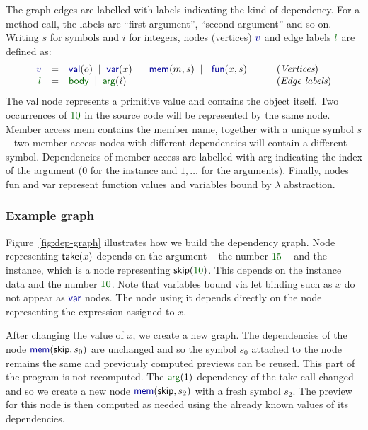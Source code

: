 \documentclass[english,submission]{programming}
\theoremstyle{plain}
\theoremstyle{definition}
\newcommand{\lsep}{\;\;|\;\;}
\newcommand{\num}[1]{\textcolor{numclr}{#1}}
\newcommand{\ident}[1]{\textnormal{\textcolor{idclr}{\sffamily #1}}}
\newcommand{\kvd}[1]{\textnormal{\textcolor{kvdclr}{\sffamily #1}}}
\newcommand{\bndclr}[1]{\textcolor{kvdclr}{#1}}
\newcommand{\blblclr}[1]{\textcolor{numclr}{#1}}
\newcommand{\bnd}[1]{\textnormal{\textcolor{kvdclr}{\sffamily #1}}}
\newcommand{\blbl}[1]{\textnormal{\textcolor{numclr}{\sffamily #1}}}
\begin{document}
The graph edges are labelled with labels indicating the kind of dependency. For
a method call, the labels are ``first argument'', ``second argument'' and so on. Writing
$s$ for symbols and $i$ for integers, nodes (vertices) $\bndclr{v}$ and edge labels $\blblclr{l}$
are defined as:
%
\begin{equation*}
\begin{array}{rcll}
\bndclr{v}&=&\bnd{val}(o) \lsep \bnd{var}(x)\lsep \bnd{mem}(m, s)\lsep \bnd{fun}(x, s)&\qquad(\textit{Vertices})\\
\blblclr{l}&=&\blbl{body} \lsep \blbl{arg}(i)&\qquad(\textit{Edge labels})\\
\end{array}
\end{equation*}
%
The \bnd{val} node represents a primitive value and contains the object itself. Two occurrences
of $\num{10}$ in the source code will be represented by the same node. Member access \bnd{mem}
contains the member name, together with a unique symbol $s$ -- two member access nodes with
different dependencies will contain a different symbol. Dependencies of member access are labelled
with \blbl{arg} indicating the index of the argument ($0$ for the instance and $1,\ldots$ for the
arguments). Finally, nodes \bnd{fun} and \bnd{var} represent function values and variables
bound by $\lambda$ abstraction.


\subsubsection{Example graph}
Figure~\ref{fig:dep-graph} illustrates how we build the
dependency graph. Node representing $\ident{take}(x)$ depends on the argument -- the
number $\num{15}$ -- and the instance, which is a node representing $\ident{skip}(\num{10})$.
This depends on the instance \ident{data} and the number $\num{10}$. Note that variables
bound via \kvd{let} binding such as $x$ do not appear as $\bnd{var}$ nodes. The node using it
depends directly on the node representing the expression assigned to $x$.

After changing the value of $x$, we create a new graph. The dependencies of the node
$\bnd{mem}(\ident{skip}, s_0)$ are unchanged and so the symbol $s_0$ attached to the node remains
the same and previously computed previews can be reused. This part of the program is not recomputed.
The $\blbl{arg}(1)$ dependency of the \ident{take} call
changed and so we create a new node $\bnd{mem}(\ident{skip}, s_2)$ with a fresh symbol $s_2$.
The preview for this node is then computed as needed using the already known values of its
dependencies.
\end{document}
